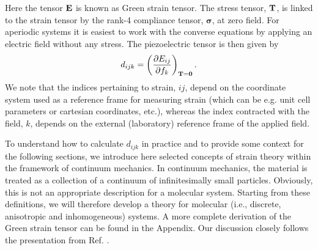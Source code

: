 Here the tensor $\bf{E}$ is known as Green strain tensor. 
The stress tensor, $\bf{T}$, is linked to the strain tensor
by the rank-4 compliance tensor, $\bm{\sigma}$, at zero field. 
For aperiodic systems it is easiest to work with the converse equations by applying an electric field without any
stress. 
%
The piezoelectric tensor is then given by 
\begin{equation}
\label{eq:piezoTen}
d_{ijk} = \left(\frac{\partial E_{ij}}{\partial f_k}\right)_{{\bf T} = {\bf 0}}.
\end{equation}
We note that the indices pertaining to strain, ${ij}$, depend on the coordinate system used as a reference frame
for measuring strain (which can be e.g. unit cell parameters or cartesian coordinates, etc.), whereas the index contracted with the
field, $k$, depends on the external (laboratory) reference frame of the applied field.

To understand how to calculate $d_{ijk}$ in practice and to provide some context for the following sections, we 
introduce here selected concepts of strain theory within the framework of continuum mechanics. 
In continuum mechanics, the material is treated as a   
collection of a continuum of infinitesimally small particles. 
Obviously, this is not an appropriate description for a
molecular system. 
Starting from these definitions, we will therefore develop a theory for molecular (i.e., discrete, anisotropic and inhomogeneous) systems. 
A more complete derivation of the Green strain tensor can be found in the Appendix. 
Our discussion closely follows the presentation from Ref. \cite{contMech}.

